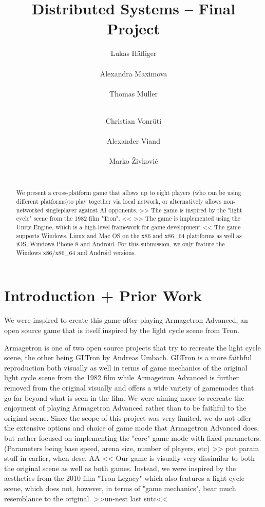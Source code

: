 \documentclass{report}
\title{Distributed Systems -- Final Project}
\author{
%
%
\alignauthor Lukas Häfliger\\
	\affaddr{ETH ID 11-916-376}\\
	\email{haelukas@student.ethz.ch}
\alignauthor Alexandra Maximova\\
 	\affaddr{ETH ID 09-913-53}\\
 	\email{amaximov@student.ethz.ch}
 	\alignauthor Thomas Müller\\
 	\affaddr{ETH ID 11-946-936}\\
 	\email{muelltho@student.ethz.ch} 
\and  %
\alignauthor Christian Vonrüti\\
 	\affaddr{ETH ID 11-930-914}\\
 	\email{cvonruet@student.ethz.ch} 
\alignauthor Alexander Viand\\
	\affaddr{ETH ID 09-940-131}\\
	\email{vianda@student.ethz.ch}
\alignauthor Marko Živković\\
	\affaddr{ETH ID 10-921-211}\\
	\email{markoz@student.ethz.ch}
}
\begin{document}
\maketitle

\begin{abstract}
We present a cross-platform game that allows up to eight players (who can be using different platforms)to play together via local network, 
or alternatively allows non-networked singleplayer against AI opponents.
>> The game is inspired by the "light cycle" scene from the 1982 film "Tron". <<
>> The game is implemented using the Unity Engine, which is a high-level framework for game development << 
The game supports Windows, Linux and Mac OS on the x86 and x86\_64 plattforms as well as iOS, Windows Phone 8 and Android.
For this submission, we only feature the Windows x86/x86\_64 and Android versions.

\end{abstract}

\section{Introduction + Prior Work}

We were inspired to create this game after playing Armagetron Advanced, an open source game that is itself inspired by the light cycle scene from Tron.

Armagetron is one of two open source projects that try to recreate the light cycle scene, the other being GLTron by Andreas Umbach.
GLTron is a more faithful reproduction both visually as well in terms of game mechanics of the original light cycle scene from the 1982 film while Armagetron Advanced is further removed from the original visually and offers a wide variety of gamemodes that go far beyond what is seen in the film.
We were aiming more to recreate the enjoyment of playing Armagetron Advanced rather than to be faithful to the original scene.
Since the scope of this project was very limited, we do not offer the extensive options and choice of game mode that Armagetron Advanced does, 
but rather focused on implementing the "core" game mode with fixed parameters. (Parameters being base speed, arena size, number of players, etc)
>> put param stuff in earlier, when desc. AA  <<
Our game is visually very dissimilar to both the original scene as well as both games. Instead, we were inspired by the aesthetics from the 2010 film "Tron Legacy" which also features a light cycle scene, which does not, however, in terms of "game mechanics", bear much resemblance to the original. >>un-nest last sntc<<
\end{document}
